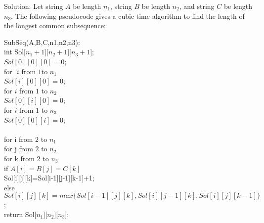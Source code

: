 \documentclass{article}
\begin{document}
\begin{enumerate}
\newline
\newline Solution: Let string $A$ be length $n_1$, string $B$ be length $n_2$, and string $C$ be length $n_3$. The following pseudocode gives a cubic time algorithm to find the length of the longest common subsequence:
\begin{tabbing}
SubS\= eq(A,B,C,n1,n2,n3):\\
\>int Sol[$n_1+1$][$n_2+1$][$n_3+1$];\\
\>$Sol[0][0][0] = 0$;\\
\>for \= $i$ fro\= m $1$\= to  $n_1$\= \\
\>\>$Sol[i][0][0] = 0$;\\
\>for $i$ from $1$ to $n_2$\\
\>\>$Sol[0][i][0] = 0$;\\
\>for $i$ from $1$ to $n_3$\\
\>\>$Sol[0][0][i] = 0$;\\
\>\\
\>for i from $2$ to $n_1$\\
\>\>for  j from $2$ to $n_2$\\
\>\>\>for k from $2$ to $n_3$\\
\>\>\>\>if $A[i]=B[j]=C[k]$\\
\>\>\>\>\>Sol[i][j][k]=Sol[i-1][j-1][k-1]+1;\\
\>\>\>\>else\\
\>\>\>\>\>$Sol[i][j][k] = max\{Sol[i-1][j][k],Sol[i][j-1][k],Sol[i][j][k-1]\}$;\\
\>return Sol[$n_1$][$n_2$][$n_3$];
\end{tabbing}


\end{enumerate}
\end{document}
